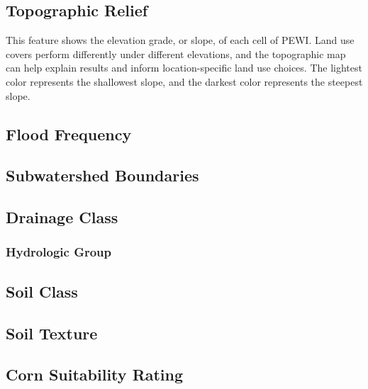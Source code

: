 \documentclass[11pt]{article}
\begin{document}
\subsection{Topographic Relief}
This feature shows the elevation grade, or slope, of each cell of PEWI. Land use covers perform differently under different elevations, and the topographic map can help explain results and inform location-specific land use choices. The lightest color represents the shallowest slope, and the darkest color represents the steepest slope.

\subsection{Flood Frequency}

\subsection{Subwatershed Boundaries}

\subsection{Drainage Class}

\subsubsection{Hydrologic Group}

\subsection{Soil Class}

\subsection{Soil Texture}

\subsection{Corn Suitability Rating}


\newpage
\end{document}

